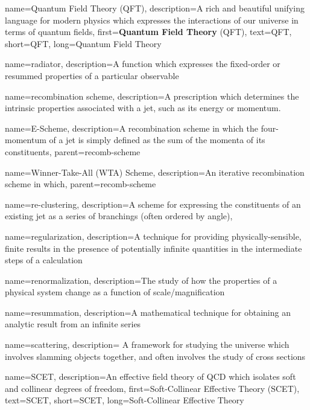{
    name=Quantum Field Theory (QFT),
    description={A rich and beautiful unifying language for modern physics which expresses the interactions of our universe in terms of quantum fields},
    first={\textbf{Quantum Field Theory} (QFT)},
    text={QFT},
    short={QFT},
    long={Quantum Field Theory}
}


{
  name=radiator,
  description={A function which expresses the fixed-order or resummed properties of a particular observable}
}


{
  name=recombination scheme,
  description={A prescription which determines the intrinsic properties associated with a jet, such as its energy or momentum.}
}

{
  name=E-Scheme,
  description={A recombination scheme in which the four-momentum of a jet is simply defined as the sum of the momenta of its constituents},
  parent=recomb-scheme
}


{
  name=Winner-Take-All (WTA) Scheme,
  description={An iterative recombination scheme in which},
  parent=recomb-scheme
}


{
    name=re-clustering,
    description={A scheme for expressing the constituents of an existing jet as a series of branchings (often ordered by angle)},
}


{
  name=regularization,
  description={A technique for providing physically-sensible, finite results in the presence of potentially infinite quantities in the intermediate steps of a calculation}
}


{
  name=renormalization,
  description={The study of how the properties of a physical system change as a function of scale/magnification}
}


{
  name=resummation,
  description={A mathematical technique for obtaining an analytic result from an infinite series}
}



{
    name=scattering,
    description={
        A framework for studying the universe which involves slamming objects together, and often involves the study of cross sections
    }
}


{
    name=SCET,
    description={An effective field theory of QCD which isolates soft and collinear degrees of freedom},
    first={Soft-Collinear Effective Theory (SCET)},
    text={SCET},
    short={SCET},
    long={Soft-Collinear Effective Theory}
}

